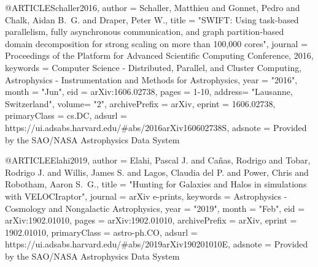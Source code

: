 @ARTICLE{Schaller2016,
       author = {{Schaller}, Matthieu and {Gonnet}, Pedro and {Chalk}, Aidan B.~G. and
         {Draper}, Peter W.},
        title = "{SWIFT: Using task-based parallelism, fully asynchronous communication, and graph partition-based domain decomposition for strong scaling on more than 100,000 cores}",
      journal = {Proceedings of the Platform for Advanced Scientific Computing Conference, 2016},
     keywords = {Computer Science - Distributed, Parallel, and Cluster Computing, Astrophysics - Instrumentation and Methods for Astrophysics},
         year = "2016",
        month = "Jun",
          eid = {arXiv:1606.02738},
        pages = {1-10},
        address= "Lausanne, Switzerland",
        volume= "2",
archivePrefix = {arXiv},
       eprint = {1606.02738},
 primaryClass = {cs.DC},
       adsurl = {https://ui.adsabs.harvard.edu/\#abs/2016arXiv160602738S},
      adsnote = {Provided by the SAO/NASA Astrophysics Data System}
}

@ARTICLE{Elahi2019,
       author = {{Elahi}, Pascal J. and {Ca{\~n}as}, Rodrigo and {Tobar}, Rodrigo J. and
         {Willis}, James S. and {Lagos}, Claudia del P. and {Power}, Chris and
         {Robotham}, Aaron S.~G.},
        title = "{Hunting for Galaxies and Halos in simulations with VELOCIraptor}",
      journal = {arXiv e-prints},
     keywords = {Astrophysics - Cosmology and Nongalactic Astrophysics},
         year = "2019",
        month = "Feb",
          eid = {arXiv:1902.01010},
        pages = {arXiv:1902.01010},
archivePrefix = {arXiv},
       eprint = {1902.01010},
 primaryClass = {astro-ph.CO},
       adsurl = {https://ui.adsabs.harvard.edu/\#abs/2019arXiv190201010E},
      adsnote = {Provided by the SAO/NASA Astrophysics Data System}
}

